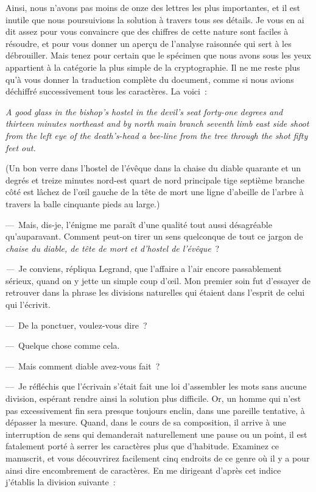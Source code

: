 \documentclass[french,twoside]{book} %
\begin{document}
\noindent Ainsi, nous n’avons pas moins de onze des lettres les plus importantes, et il est inutile que nous poursuivions la solution à travers tous ses détails. Je vous en ai dit assez pour vous convaincre que des chiffres de cette nature sont faciles à résoudre, et pour vous donner un aperçu de l’analyse raisonnée qui sert à les débrouiller. Mais tenez pour certain que le spécimen que nous avons sous les yeux appartient à la catégorie la plus simple de la cryptographie. Il ne me reste plus qu’à vous donner la traduction complète du document, comme si nous avions déchiffré successivement tous les caractères. La voici :\par
{\itshape A good glass in the bishop’s hostel in the devil’s seat forty-one degrees and thirteen minutes northeast and by north main branch seventh limb east side shoot from the left eye of the death’s-head a bee-line from the tree through the shot fifty feet out.}\par
(Un bon verre dans l’hostel de l’évêque dans la chaise du diable quarante et un degrés et treize minutes nord-est quart de nord principale tige septième branche côté est lâchez de l’œil gauche de la tête de mort une ligne d’abeille de l’arbre à travers la balle cinquante pieds au large.)\par
\bigbreak
\noindent — Mais, dis-je, l’énigme me paraît d’une qualité tout aussi désagréable qu’auparavant. Comment peut-on tirer un sens quelconque de tout ce jargon de \emph{chaise du diable, de tête de mort et d’hostel de l’évêque} ?\par
\emph{—} Je conviens, répliqua Legrand, que l’affaire a l’air encore passablement sérieux, quand on y jette un simple coup d’œil. Mon premier soin fut d’essayer de retrouver dans la phrase les divisions naturelles qui étaient dans l’esprit de celui qui l’écrivit.\par
— De la ponctuer, voulez-vous dire ?\par
— Quelque chose comme cela.\par
— Mais comment diable avez-vous fait ?\par
— Je réfléchis que l’écrivain s’était fait une loi d’assembler les mots sans aucune division, espérant rendre ainsi la solution plus difficile. Or, un homme qui n’est pas excessivement fin sera presque toujours enclin, dans une pareille tentative, à dépasser la mesure. Quand, dans le cours de sa composition, il arrive à une interruption de sens qui demanderait naturellement une pause ou un point, il est fatalement porté à serrer les caractères plus que d’habitude. Examinez ce manuscrit, et vous découvrirez facilement cinq endroits de ce genre où il y a pour ainsi dire encombrement de caractères. En me dirigeant d’après cet indice j’établis la division suivante :\par
\end{document}
